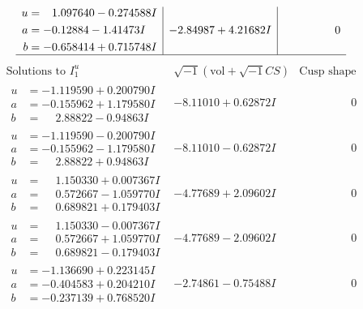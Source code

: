 \documentclass[1p]{elsarticle_modified}
\theoremstyle{definition}
\newcommand{\I}{\sqrt{-1}}
\begin{document}
$$\begin{array}{c|c|c}
\begin{aligned}
u &= \phantom{-}1.097640 - 0.274588 I \\
a &= -0.12884 - 1.41473 I \\
b &= -0.658414 + 0.715748 I\end{aligned}
 & -2.84987 + 4.21682 I & \phantom{-0.000000 } 0\\
 \hline 
 \end{array}$$\newpage$$\begin{array}{c|c|c}  
\text{Solutions to }I^u_{1}& \I (\text{vol} + \sqrt{-1}CS) & \text{Cusp shape}\\
 \hline 
\begin{aligned}
u &= -1.119590 + 0.200790 I \\
a &= -0.155962 + 1.179580 I \\
b &= \phantom{-}2.88822 - 0.94863 I\end{aligned}
 & -8.11010 + 0.62872 I & \phantom{-0.000000 } 0 \\ \hline\begin{aligned}
u &= -1.119590 - 0.200790 I \\
a &= -0.155962 - 1.179580 I \\
b &= \phantom{-}2.88822 + 0.94863 I\end{aligned}
 & -8.11010 - 0.62872 I & \phantom{-0.000000 } 0 \\ \hline\begin{aligned}
u &= \phantom{-}1.150330 + 0.007367 I \\
a &= \phantom{-}0.572667 - 1.059770 I \\
b &= \phantom{-}0.689821 + 0.179403 I\end{aligned}
 & -4.77689 + 2.09602 I & \phantom{-0.000000 } 0 \\ \hline\begin{aligned}
u &= \phantom{-}1.150330 - 0.007367 I \\
a &= \phantom{-}0.572667 + 1.059770 I \\
b &= \phantom{-}0.689821 - 0.179403 I\end{aligned}
 & -4.77689 - 2.09602 I & \phantom{-0.000000 } 0 \\ \hline\begin{aligned}
u &= -1.136690 + 0.223145 I \\
a &= -0.404583 + 0.204210 I \\
b &= -0.237139 + 0.768520 I\end{aligned}
 & -2.74861 - 0.75488 I & \phantom{-0.000000 } 0 \\ \hline\begin{aligned}

\end{aligned}
\end{array}$$
\end{document}
